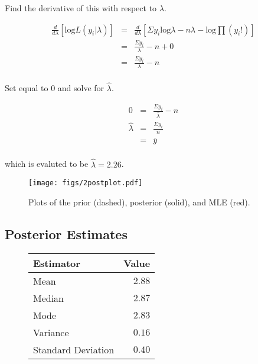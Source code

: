 \documentclass[12pt]{article}
\newcommand{\ybar}{\overline{y}}
\begin{document}
\noindent Find the derivative of this with respect to $\lambda$.

\begin{eqnarray*}
\frac{d}{d\lambda}\left[\mathrm{log}L(y_i|\lambda)\right] &=& \frac{d}{d\lambda}\left[\Sigma y_i\mathrm{log}\lambda-n\lambda-\mathrm{log}\prod (y_i!)\right] \\
&=& \frac{\Sigma y_i}{\lambda}-n+0 \\
&=& \frac{\Sigma y_i}{\lambda}-n \\
\end{eqnarray*}

\noindent Set equal to 0 and solve for $\hat{\lambda}$.

\begin{eqnarray*}
0 &=& \frac{\Sigma y_i}{\hat{\lambda}}-n \\
\hat{\lambda} &=& \frac{\Sigma y_i}{n} \\
&=& \ybar \\
\end{eqnarray*}

\noindent which is evaluted to be $\hat{\lambda}=2.26$.

\begin{figure}[H]
\begin{center}
\texttt{[image: figs/2postplot.pdf]}
\caption{Plots of the prior (dashed), posterior (solid), and MLE (red).}
\end{center}
\end{figure}

\subsection{Posterior Estimates}

\begin{figure}[H]
\begin{center}
\begin{tabular}{l|r}
Estimator & \multicolumn{1}{l}{Value} \\ \hline \hline
Mean               & $2.88$ \\
Median             & $2.87$ \\
Mode               & $2.83$ \\
Variance           & $0.16$ \\
Standard Deviation & $0.40$ \\
\end{tabular}
\end{center}
\end{figure}
\end{document}
